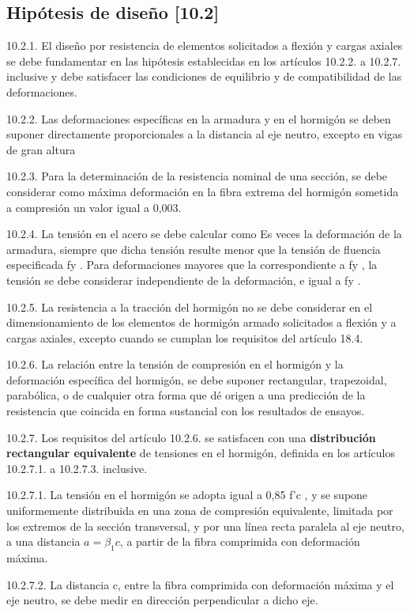 \documentclass[twocolumn]{article}
\begin{document}
\subsection{Hipótesis de diseño [10.2]}
10.2.1. El diseño por resistencia de elementos solicitados a flexión y cargas axiales se
debe fundamentar en las hipótesis establecidas en los artículos 10.2.2. a 10.2.7. inclusive y debe satisfacer las condiciones de equilibrio y de compatibilidad de las
deformaciones.

10.2.2. Las deformaciones específicas en la armadura y en el hormigón se deben suponer directamente proporcionales a la distancia al eje neutro, excepto en vigas de gran altura

10.2.3. Para la determinación de la resistencia nominal de una sección, se debe considerar como máxima deformación en la fibra extrema del hormigón sometida a
compresión un valor igual a 0,003.

10.2.4. La tensión en el acero se debe calcular como Es veces la deformación de la armadura, siempre que dicha tensión resulte menor que la tensión de fluencia especificada fy . Para deformaciones mayores que la correspondiente a fy , la tensión se debe considerar independiente de la deformación, e igual a fy .

10.2.5. La resistencia a la tracción del hormigón no se debe considerar en el dimensionamiento de los elementos de hormigón armado solicitados a flexión y a cargas axiales, excepto cuando se cumplan los requisitos del artículo 18.4.

10.2.6. La relación entre la tensión de compresión en el hormigón y la deformación específica del hormigón, se debe suponer rectangular, trapezoidal, parabólica, o de
cualquier otra forma que dé origen a una predicción de la resistencia que coincida en forma sustancial con los resultados de ensayos.

10.2.7. Los requisitos del artículo 10.2.6. se satisfacen con una \textbf{distribución rectangular equivalente} de tensiones en el hormigón, definida en los artículos 10.2.7.1. a 10.2.7.3. inclusive.

10.2.7.1. La tensión en el hormigón se adopta igual a 0,85 f’c , y se supone uniformemente distribuida en una zona de compresión equivalente, limitada por los
extremos de la sección transversal, y por una línea recta paralela al eje neutro, a una distancia $a = \beta_1 c$, a partir de la fibra comprimida con deformación máxima.

10.2.7.2. La distancia c, entre la fibra comprimida con deformación máxima y el eje
neutro, se debe medir en dirección perpendicular a dicho eje.
\end{document}
